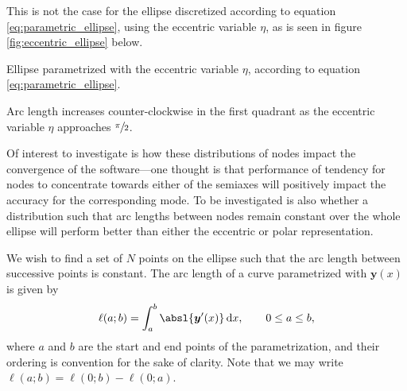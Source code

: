 This is not the case for the ellipse discretized according to equation \eqref{eq:parametric_ellipse}, using the eccentric variable $\eta$, as is seen in figure \ref{fig:eccentric_ellipse} below.
\begin{Figure}
  \centering
  \scalebox{1}{%
    
  }
  \captionsetup{type = figure}
  \caption{Ellipse parametrized with the eccentric variable $\eta$, according to equation \eqref{eq:parametric_ellipse}.}
  \label{fig:eccentric_ellipse}
\end{Figure}
\begin{Figure}
  \centering
  \scalebox{1}{%
    
  }
  \captionsetup{type = figure}
  \caption{Arc length increases counter-clockwise in the first quadrant as the eccentric variable $\eta$ approaches $\sfrac{\pi}{2}$.}
\end{Figure}
Of interest to investigate is how these distributions of nodes impact the convergence of the software---one thought is that performance of tendency for nodes to concentrate towards either of the semiaxes will positively impact the accuracy for the corresponding mode.
To be investigated is also whether a distribution such that arc lengths between nodes remain constant over the whole ellipse will perform better than either the eccentric or polar representation.

We wish to find a set of $N$ points on the ellipse such that the arc length between successive points is constant.
The arc length of a curve parametrized with $\bm{y}(x)$ is given by
\[
\ell(a;b) = \int_{a}^{b} \absl{\bm{y}^{\prime}(x)} \,\dee x, \qquad 0 \leq a \leq b,
\]
where $a$ and $b$ are the start and end points of the parametrization, and their ordering is convention for the sake of clarity.
Note that we may write $\ell(a;b) = \ell(0;b) - \ell(0;a)$.
